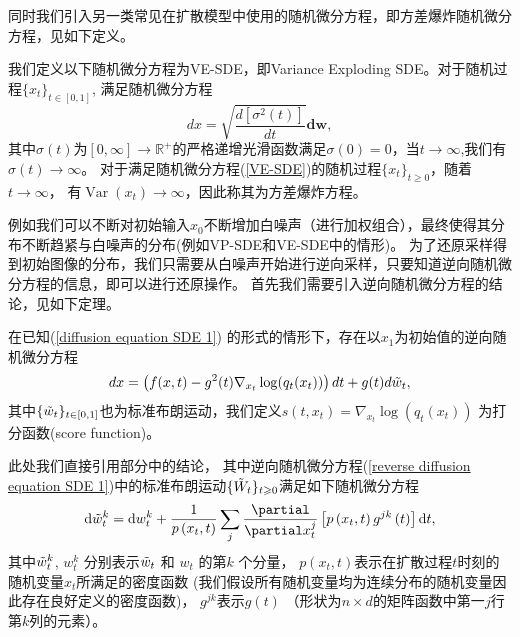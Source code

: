 同时我们引入另一类常见在扩散模型中使用的随机微分方程，即方差爆炸随机微分方程，见如下定义。
\begin{definition}我们定义以下随机微分方程为VE-SDE，即Variance Exploding SDE。对于随机过程$\{x_t\}_{t\in [0,1]}$, 满足随机微分方程
    \begin{equation}
        dx = \sqrt{\frac{d\left[\sigma^2(t)\right]}{dt}}\mathbf{d}\mathbf{w}, \label{VE-SDE}
    \end{equation}
    其中$\sigma(t)$为$[0,\infty]\xrightarrow{}\mathbb{R}^+$的严格递增光滑函数满足$\sigma(0)=0$，当$t\to \infty$,我们有 $\sigma(t)\xrightarrow{}\infty$。
    对于满足随机微分方程(\ref{VE-SDE})的随机过程$\{x_t\}_{t\geq 0}$，随着$t\to \infty$， 有$\operatorname{Var}(x_t)\xrightarrow{}\infty$，因此称其为方差爆炸方程。 
\end{definition}

例如我们可以不断对初始输入$x_0$不断增加白噪声（进行加权组合），最终使得其分布不断趋紧与白噪声的分布(例如VP-SDE和VE-SDE中的情形)。 为了还原采样得到初始图像的分布，我们只需要从白噪声开始进行逆向采样，只要知道逆向随机微分方程的信息，即可以进行还原操作。 首先我们需要引入逆向随机微分方程的结论，见如下定理。

\begin{theorem}[逆向随机微分方程]
在已知(\ref{diffusion equation SDE 1}) 的形式的情形下，存在以$x_1$为初始值的逆向随机微分方程
\begin{equation}
     dx = \left(f(x,t)-g^2(t)\nabla_{x_t}\log(q_t(x_t))\right)dt + g(t)d\Tilde{w}_t,
    \label{reverse diffusion equation SDE 1}
\end{equation}
其中$\{\Tilde{w}_t\}_{t\in [0,1]}$也为标准布朗运动，我们定义$s(t,x_t) = \nabla_{x_t}\log(q_t(x_t))$ 为打分函数(score function)。
\end{theorem}
    此处我们直接引用部分\cite{Anderson1982ReversetimeDE}中的结论， 其中逆向随机微分方程(\ref{reverse diffusion equation SDE 1})中的标准布朗运动$\{\Tilde{W}_t\}_{t\geq 0}$满足如下随机微分方程
    \begin{equation}
     \mathrm{d} \Tilde{w}_t^k=\mathrm{d} w_t^k+\frac{1}{p\left(x_t, t\right)} \sum_j \frac{\partial}{\partial x_t^j}\left[p\left(x_t, t\right) g^{j k}\left(t\right)\right] \mathrm{d} t,
        \label{Tilde W SDE equation}
    \end{equation}
其中$\Tilde{w}_t^k$, $w_t^k$ 分别表示$\Tilde{w}_t$ 和 $w_t$ 的第$k$ 个分量， $p(x_t,t)$表示在扩散过程$t$时刻的随机变量$x_t$所满足的密度函数 (我们假设所有随机变量均为连续分布的随机变量因此存在良好定义的密度函数)， $g^{jk}$表示$g(t)$ （形状为$n\times d$的矩阵函数中第一$j$行第$k$列的元素）。 

